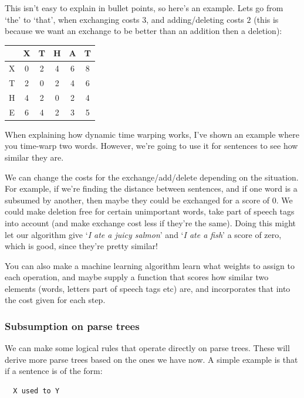 
This isn't easy to explain in bullet points, so here's an example. Lets go from
`the' to `that', when exchanging costs $3$, and adding/deleting costs $2$ (this
is because we want an exchange to be better than an addition then a deletion):

\begin{center}
  \begin{tabular}{c|c c c c c}
      & X & T & H & A & T\\ \hline
    X & 0 & 2 & 4 & 6 & 8\\ 
    T & 2 & 0 & 2 & 4 & 6\\
    H & 4 & 2 & 0 & 2 & 4\\
    E & 6 & 4 & 2 & 3 & 5
  \end{tabular}
\end{center}

When explaining how dynamic time warping works, I've shown an example where you
time-warp two words. However, we're going to use it for sentences to see how
similar they are.

We can change the costs for the exchange/add/delete depending on the  situation.
For example, if we're finding the distance between sentences, and if  one word
is a subsumed by another, then maybe they could be exchanged for a  score of
$0$. We could make deletion free for certain unimportant words, take part of
speech tags into account (and make exchange cost less if they're the same).
Doing this might let our algorithm give `\textit{I ate a juicy salmon}' and
`\textit{I ate a fish}' a score of zero, which is good, since they're pretty
similar!

You can also make a machine learning algorithm learn what weights to assign to
each operation, and maybe supply a function that scores how similar two elements
(words, letters part of speech tags etc) are, and incorporates that into the
cost given for each step.

\subsubsection{Subsumption on parse trees}

We can make some logical rules that operate directly on parse trees. These will
derive more parse trees based on the ones we have now. A simple example is that
if a sentence is of the form:

\begin{verbatim}
  X used to Y
\end{verbatim}

